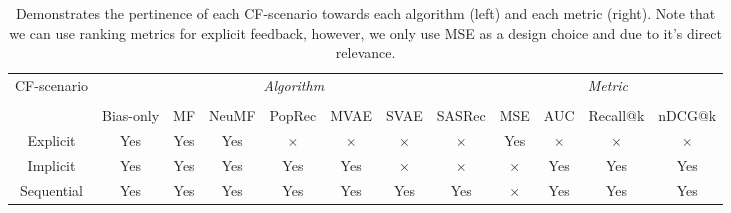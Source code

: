 \begin{table}[!ht]
\begin{small}
\begin{center}
        \begin{tabular}{c | c c c c c c c | c c c c}
            \toprule
            \multirow{3}{*}{CF-scenario} & \multicolumn{7}{c|}{\emph{Algorithm}} & \multicolumn{4}{c}{\emph{Metric}} \\
            & \multicolumn{7}{c|}{} & \multicolumn{4}{c}{} \\
            & Bias-only & MF & NeuMF & PopRec & MVAE & SVAE & SASRec & MSE & AUC & Recall@k & nDCG@k \\ \midrule
            Explicit & Yes & Yes & Yes & $\times$ & $\times$ & $\times$ & $\times$ & Yes & $\times$ & $\times$ & $\times$ \\[0.6mm]
            Implicit & Yes & Yes & Yes & Yes & Yes & $\times$ & $\times$ & $\times$ & Yes & Yes & Yes \\[0.6mm]
            Sequential & Yes & Yes & Yes & Yes & Yes & Yes & Yes & $\times$ & Yes & Yes & Yes \\[0.6mm]
            \bottomrule
        \end{tabular}
    \end{center}
    \end{small}
    \bigskip
    \caption{Demonstrates the pertinence of each CF-scenario towards each algorithm (left) and each metric (right). Note that we can use ranking metrics for explicit feedback, however, we only use MSE as a design choice and due to it's direct relevance.}
    \label{model_scenario_table}
    \vspace{-6mm} %
\end{table}
\makeatletter \renewcommand\paragraph{ {2mm \@plus1ex \@minus.2ex} {-0.7em} {\normalfont\normalsize\itshape}} \makeatother

